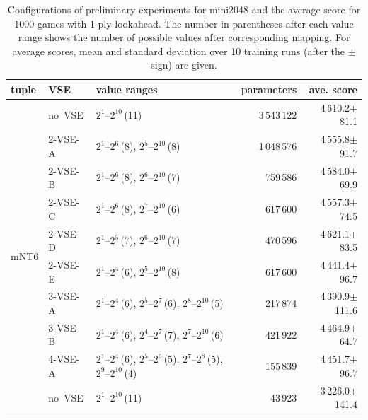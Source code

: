 \begin{table}
\caption{Configurations of preliminary experiments for mini2048 and the average score for 1000 games with 1-ply lookahead. The number in parentheses after each value range shows the number of possible values after corresponding mapping. For average scores, mean and standard deviation over 10 training runs (after the $\pm$ sign) are given.}
\label{table:pre-results}
 \setlength{\doublerulesep}{.4pt}
 \centering\begin{tabular}{l|l|p{170pt}|r|r}
  \hline\hline
   tuple			& VSE			& value ranges									& parameters	& ave. score \\
  \hline
   \multirow{11}{*}{\textsf{mNT6}}	& \mbox{no VSE}		& \phantom{\rule{1pt}{9.5pt}}$2^1$--$2^{10}$\,(11)								& 3\,543\,122	& 4\,610.2$\pm$\phantom{0}81.1 \\ \cline{2-5}
				& \mbox{2-VSE-A}	& \phantom{\rule{1pt}{9.5pt}}$2^1$--$2^6$\,(8), $2^{5}$--$2^{10}$\,(8)					& 1\,048\,576	& 4\,555.8$\pm$\phantom{0}91.7\\ \cline{2-5}
				& \mbox{2-VSE-B}	& \phantom{\rule{1pt}{9.5pt}}$2^1$--$2^6$\,(8), $2^{6}$--$2^{10}$\,(7)					& 759\,586	& 4\,584.0$\pm$\phantom{0}69.9\\ \cline{2-5}
				& \mbox{2-VSE-C}	& \phantom{\rule{1pt}{9.5pt}}$2^1$--$2^6$\,(8), $2^{7}$--$2^{10}$\,(6)					& 617\,600	& 4\,557.3$\pm$\phantom{0}74.5\\ \cline{2-5}
				& \mbox{2-VSE-D}	& \phantom{\rule{1pt}{9.5pt}}$2^1$--$2^5$\,(7), $2^{6}$--$2^{10}$\,(7)					& 470\,596	& 4\,621.1$\pm$\phantom{0}83.5\\ \cline{2-5}
				& \mbox{2-VSE-E}	& \phantom{\rule{1pt}{9.5pt}}$2^1$--$2^4$\,(6), $2^{5}$--$2^{10}$\,(8)					& 617\,600	& 4\,441.4$\pm$\phantom{0}96.7\\ \cline{2-5}
				& \mbox{3-VSE-A}	& \phantom{\rule{1pt}{9.5pt}}$2^1$--$2^4$\,(6), $2^{5}$--$2^{7}$\,(6), $2^8$--$2^{10}$\,(5)			& 217\,874	& 4\,390.9$\pm$111.6\\ \cline{2-5}
				& \mbox{3-VSE-B}	& \phantom{\rule{1pt}{9.5pt}}$2^1$--$2^4$\,(6), $2^{4}$--$2^{7}$\,(7), $2^7$--$2^{10}$\,(6)			& 421\,922	& 4\,464.9$\pm$\phantom{0}64.7\\ \cline{2-5}
				& \mbox{4-VSE-A}	& \phantom{\rule{1pt}{9.5pt}}$2^1$--$2^4$\,(6), $2^5$--$2^6$\,(5), $2^7$--$2^8$\,(5), $2^9$--$2^{10}$\,(4)	& 155\,839	& 4\,451.7$\pm$\phantom{0}96.7\\ \hline
   \textsf{mNT4}				& \mbox{no VSE}		& \phantom{\rule{1pt}{9.5pt}}$2^1$--$2^{10}$\,(11)								& 43\,923	& 3\,226.0$\pm$141.4\\\hline
 \end{tabular}
\end{table}

